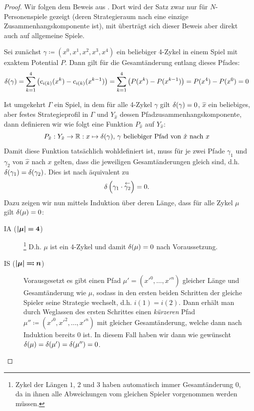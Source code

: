 \begin{proof}
	Wir folgen dem Beweis aus \cite[Anhang A]{MonShap}. Dort wird der Satz zwar nur für $N$-Personenspiele gezeigt (deren Strategieraum nach  eine einzige Zusammenhangskomponente ist), mit  überträgt sich dieser Beweis aber direkt auch auf allgemeine Spiele.
	
	Sei zunächst $\gamma \coloneqq (x^0, x^1, x^2, x^3, x^4)$ ein beliebiger 4-Zykel in einem Spiel mit exaktem Potential $P$. Dann gilt für die Gesamtänderung entlang dieses Pfades:
		\[\delta(\gamma) = \sum_{k=1}^4 \left(c_{i(k)}(x^k) - c_{i(k)}(x^{k-1})\right) = \sum_{k=1}^{4} \left(P(x^k) - P(x^{k-1})\right) = P(x^4) - P(x^0) = 0^{}\]
		
	Ist umgekehrt $\Gamma$ ein Spiel, in dem für alle 4-Zykel $\gamma$ gilt $\delta(\gamma) = 0$, $\hat{x}$ ein beliebiges, aber festes Strategieprofil in $\Gamma$ und $Y_{\hat{x}}$ dessen Pfadzusammenhangskomponente, dann definieren wir wie folgt eine Funktion $P_{\hat{x}}$ auf $Y_{\hat{x}}$:
		\[P_{\hat{x}}: Y_{\hat{x}} \to \mathbb{R}: x \mapsto \delta(\gamma), \,\gamma \text{ beliebiger Pfad von } \hat{x} \text{ nach } x \]
	Damit diese Funktion tatsächlich wohldefiniert ist, muss für je zwei Pfade $\gamma_1$ und $\gamma_2$ von $\hat{x}$ nach $x$ gelten, dass die jeweiligen Gesamtänderungen gleich sind, d.h. $\delta(\gamma_1) = \delta(\gamma_2)$. Dies ist nach  äquivalent zu
		\[\delta\left(\gamma_1 \cdot \overset{\leftarrow}{\gamma_2}\right) = 0.\]
	Dazu zeigen wir nun mittels Induktion über deren Länge, dass für alle Zykel $\mu$ gilt $\delta(\mu) = 0$:
	\begin{description}
		\item[IA ($\bm{\left|\mu\right|=4}$)]\hspace{-.5em}\footnote{Zykel der Längen $1$, $2$ und $3$ haben automatisch immer Gesamtänderung $0$, da in ihnen alle Abweichungen vom gleichen Spieler vorgenommen werden müssen.} D.h. $\mu$ ist ein 4-Zykel und damit $\delta(\mu) = 0$ nach Voraussetzung.
		\item[IS ($\bm{\left|\mu\right|\eqqcolon n}$)] Vorausgesetzt es gibt einen Pfad $\mu' = (x'^0, \dots, x'^n)$ gleicher Länge und Gesamtänderung wie $\mu$, sodass in den ersten beiden Schritten der gleiche Spieler seine Strategie wechselt, d.h. $i(1)=i(2)$. Dann erhält man durch Weglassen des ersten Schrittes einen \emph{kürzeren} Pfad $\mu'' \coloneqq (x'^0, x'^2, \dots, x'^n)$ mit gleicher Gesamtänderung, welche dann nach Induktion bereits $0$ ist. In diesem Fall haben wir dann wie gewünscht $\delta(\mu) = \delta(\mu') = \delta(\mu'') = 0$.
		

\end{description}
\end{proof}
